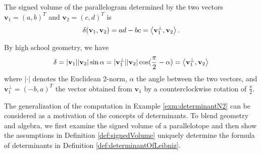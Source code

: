 \begin{exm}
  \label{exm:determinantN2}
  The signed volume of the parallelogram
  determined by the two vectors $\mathbf{v}_1=(a,b)^T$
  and  $\mathbf{v}_2=(c,d)^T$
  is 
   \begin{equation}
     \label{eq:determinantN2}
    \delta(\mathbf{v}_1, \mathbf{v}_2)
    = ad-bc = \left\langle \mathbf{v}^{\perp}_1, \mathbf{v}_2 \right\rangle.
  \end{equation}

  By high school geometry, we have
  \begin{displaymath}
    \delta = |\mathbf{v}_1||\mathbf{v}_2|\sin \alpha
    = |\mathbf{v}^{\perp}_1||\mathbf{v}_2|\cos(\frac{\pi}{2}-\alpha)
    = \left\langle \mathbf{v}^{\perp}_1, \mathbf{v}_2 \right\rangle
  \end{displaymath}
  where $|\cdot|$ denotes the Euclidean 2-norm, 
  $\alpha$ the angle between the two vectors, 
  and $\mathbf{v}^{\perp}_1=(-b,a)^T$ the vector obtained from $\mathbf{v}_1$
  by a counterclockwise rotation of $\frac{\pi}{2}$.
\end{exm}

\begin{rem}
  The generalization of the computation in Example
  \ref{exm:determinantN2}
  can be considered as a motivation of the concepts of determinants.
  To blend geometry and algebra, we first examine the signed volume
  of a parallelotope and then show the assumptions in Definition
  \ref{def:signedVolume}
  uniquely determine the formula of determinants
  in Definition \ref{def:determinantOfLeibniz}. 
\end{rem}

